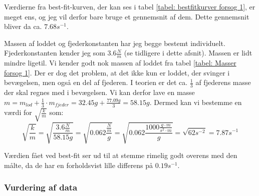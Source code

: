 Værdierne fra best-fit-kurven, der kan ses i tabel \ref{tabel: bestfitkurver forsog 1}, er meget ens, og jeg vil derfor bare bruge et gennemsnit af dem. 
Dette gennemsnit bliver da ca. $7.68s^{-1}$.

Massen af loddet og fjederkonstanten har jeg begge bestemt individuelt. 
Fjederkonstanten kender jeg som $3.6\frac{N}{m}$ (se tidligere i dette afsnit). 
Massen er lidt mindre ligetil. 
Vi kender godt nok massen af loddet fra tabel \ref{tabel: Masser forsog 1}. 
Der er dog det problem, at det ikke kun er loddet, der svinger i bevægelsen, men også en del af fjederen. 
I teorien er det ca. $\frac{1}{3}$ af fjederens masse der skal regnes med i bevægelsen.
Vi kan derfor lave en masse $m=m_{lod}+\frac{1}{3}\cdot m_{fjeder}=32.45g+\frac{77.09g}{3}=58.15g$. 
Dermed kan vi bestemme en værdi for $\sqrt{\frac{k}{m}}$ som:
$$\sqrt{\frac{k}{m}}=\sqrt{\frac{3.6\frac{N}{m}}{58.15g}}=\sqrt{0.062\frac{\frac{N}{m}}{g}}=\sqrt{0.062\frac{1000\frac{g\cdot m}{s^2\cdot m}}{g}}=\sqrt{62s^{-2}}=7.87s^{-1}$$

Værdien fået ved best-fit ser ud til at stemme rimelig godt overens med den målte, da de har en forholdsvist lille differens på $0.19s^{-1}$. 



\subsubsection{Vurdering af data}\label{exp1: Vurdering af data}

